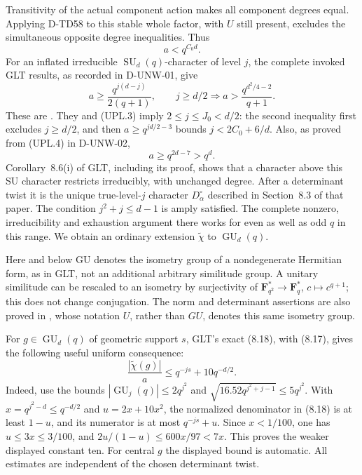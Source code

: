 Transitivity of the actual component action makes all component degrees
equal. Applying D-TD58 to this stable whole factor, with \(U\) still
present, excludes the simultaneous opposite degree inequalities. Thus
\[
                              a<q^{C_0d}.
 \tag{UPL.3}
\]
For an inflated irreducible \(\operatorname{SU}_d(q)\)-character of
level \(j\), the complete invoked GLT results, as recorded in
D-UNW-01, give
\[
 a\ge\frac{q^{j(d-j)}}{2(q+1)},\qquad
 j\ge d/2\Longrightarrow a>\frac{q^{d^2/4-2}}{q+1}.
 \tag{UPL.4}
\]
These are \cite[Definition~2, Lemma~7.1 and Theorem~7.3,
pp.~51--53]{UNW:GLT2020}. They and (UPL.3) imply
\(2\le j\le J_0<d/2\): the second inequality first excludes
\(j\ge d/2\), and then
\(a\ge q^{jd/2-3}\) bounds \(j<2C_0+6/d\).
Also, as proved from (UPL.4) in D-UNW-02,
\[
                         a\ge q^{2d-7}>q^d.
 \tag{UPL.5}
\]
Corollary~8.6(i) of GLT, including its proof, shows that a character
above this SU character restricts irreducibly, with unchanged degree.
After a determinant twist it is the unique true-level-\(j\) character
\(D_\alpha^\circ\) described in Section~8.3 of that paper.
The condition \(j^2+j\le d-1\) is amply satisfied. The complete
nonzero, irreducibility and exhaustion argument there works for even
as well as odd \(q\) in this range. We obtain an ordinary extension
\(\widetilde\chi\) to \(\operatorname{GU}_d(q)\).

Here and below GU denotes the isometry group of a nondegenerate
Hermitian form, as in GLT, not an additional arbitrary similitude
group. A unitary similitude can be rescaled to an isometry by
surjectivity of \(\mathbf F_{q^2}^*\to\mathbf F_q^*\),
\(c\mapsto c^{q+1}\); this does not change conjugation.
The norm and determinant assertions are also proved in
\cite[Lemma~10.1 and pp.~114--118]{OS:Taylor1992}, whose notation
\(U\), rather than \(GU\), denotes this same isometry group.

For \(g\in\operatorname{GU}_d(q)\) of geometric support \(s\),
GLT's exact (8.18), with (8.17), gives the following useful uniform
consequence:
\[
                 \frac{|\widetilde\chi(g)|}{a}
                         \le q^{-js}+10q^{-d/2}.
 \tag{UPL.6}
\]
Indeed, use the bounds \(|\operatorname{GU}_j(q)|\le2q^{j^2}\)
and \(\sqrt{16.52q^{j^2+j-1}}\le5q^{j^2}\). With
\(x=q^{j^2-d}\le q^{-d/2}\) and \(u=2x+10x^2\), the normalized
denominator in (8.18) is at least \(1-u\), and its numerator is at
most \(q^{-js}+u\). Since \(x<1/100\), one has
\(u\le3x\le3/100\), and
\(2u/(1-u)\le600x/97<7x\). This proves the weaker displayed
constant ten. For central \(g\) the displayed bound is automatic.
All estimates are independent of the chosen determinant twist.

